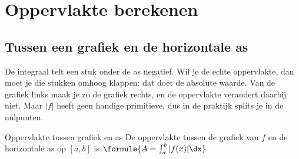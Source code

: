 \section{Oppervlakte berekenen}

\subsection{Tussen een grafiek en de horizontale as}

De integraal telt een stuk onder de as negatief. Wil je de echte oppervlakte, dan moet je die stukken omhoog klappen: dat doet de absolute waarde. Van de grafiek links maak je zo de grafiek rechts, en de oppervlakte verandert daarbij niet. Maar $|f|$ heeft geen handige primitieve, dus in de praktijk splits je in de nulpunten.


\begin{theorie}
\begin{stelling}{Oppervlakte tussen grafiek en as}
De oppervlakte tussen de grafiek van $f$ en de horizontale as op $[a, b]$ is \qquad $\formule{A = \int_a^b |f(x)|\dx}$
\end{stelling}
\end{theorie}

